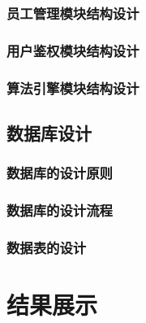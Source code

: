 \documentclass{ctexart}
\begin{document}
\subsubsection{员工管理模块结构设计}
\subsubsection{用户鉴权模块结构设计}
\subsubsection{算法引擎模块结构设计}

\subsection{数据库设计}
\subsubsection{数据库的设计原则}
\subsubsection{数据库的设计流程}
\subsubsection{数据表的设计}


\section{结果展示}
\end{document}
